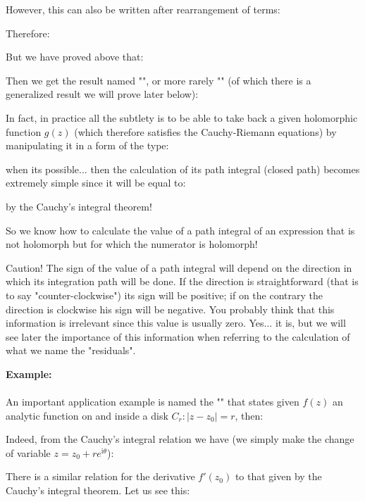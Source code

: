 	However, this can also be written after rearrangement of terms:
	
	Therefore:
	
	But we have proved above that:
	
	Then we get the result named "", or more rarely "" (of which there is a generalized result we will prove later below):
	
	In fact, in practice all the subtlety is to be able to take back a given holomorphic function $g(z)$ (which therefore satisfies the Cauchy-Riemann equations) by manipulating it in a form of the type:
	
	when its possible... then the calculation of its path integral (closed path) becomes extremely simple since it will be equal to:
	
	by the Cauchy's integral theorem!
	
	\begin{tcolorbox}[title=Remark,colframe=black,arc=10pt]
	So we know how to calculate the value of a path integral of an expression that is not holomorph but for which the numerator is holomorph! 
	\end{tcolorbox}
	
	\begin{tcolorbox}[colback=red!5,borderline={1mm}{2mm}{red!5},arc=0mm,boxrule=0pt]
	\bcbombe Caution! The sign of the value of a path integral will depend on the direction in which its integration path will be done. If the direction is straightforward (that is to say "counter-clockwise") its sign will be positive; if on the contrary the direction is clockwise his sign will be negative. You probably think that this information is irrelevant since this value is usually zero. Yes... it is, but we will see later the importance of this information when referring to the calculation of what we name the "residuals".
	\end{tcolorbox}
		
	\begin{tcolorbox}[colframe=black,colback=white,sharp corners]
	\textbf{{\Large {}}Example:}\\\\
	An important application example is named the "" that states given $f(z)$ an analytic function on and inside a disk $C_r:|z-z_0|=r$, then:
	
	Indeed, from the Cauchy's integral relation we have (we simply make the change of variable $z=z_0+re^{\mathrm{i}\theta}$):
	
	\end{tcolorbox}
	 There is a similar relation for the derivative $f'(z_0)$ to that given by the Cauchy's integral theorem. Let us see this:
	

